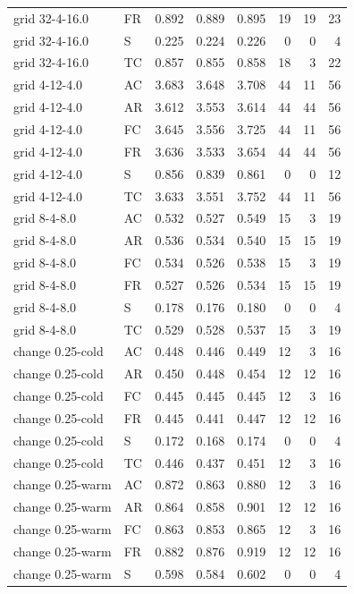 \begin{longtable}{llrrrrrr}
grid 32-4-16.0 & FR & 0.892 & 0.889 & 0.895 & 19 & 19 & 23\\
grid 32-4-16.0 & S & 0.225 & 0.224 & 0.226 & 0 & 0 & 4\\
grid 32-4-16.0 & TC & 0.857 & 0.855 & 0.858 & 18 & 3 & 22\\
grid 4-12-4.0 & AC & 3.683 & 3.648 & 3.708 & 44 & 11 & 56\\
grid 4-12-4.0 & AR & 3.612 & 3.553 & 3.614 & 44 & 44 & 56\\
grid 4-12-4.0 & FC & 3.645 & 3.556 & 3.725 & 44 & 11 & 56\\
grid 4-12-4.0 & FR & 3.636 & 3.533 & 3.654 & 44 & 44 & 56\\
grid 4-12-4.0 & S & 0.856 & 0.839 & 0.861 & 0 & 0 & 12\\
grid 4-12-4.0 & TC & 3.633 & 3.551 & 3.752 & 44 & 11 & 56\\
grid 8-4-8.0 & AC & 0.532 & 0.527 & 0.549 & 15 & 3 & 19\\
grid 8-4-8.0 & AR & 0.536 & 0.534 & 0.540 & 15 & 15 & 19\\
grid 8-4-8.0 & FC & 0.534 & 0.526 & 0.538 & 15 & 3 & 19\\
grid 8-4-8.0 & FR & 0.527 & 0.526 & 0.534 & 15 & 15 & 19\\
grid 8-4-8.0 & S & 0.178 & 0.176 & 0.180 & 0 & 0 & 4\\
grid 8-4-8.0 & TC & 0.529 & 0.528 & 0.537 & 15 & 3 & 19\\
change 0.25-cold & AC & 0.448 & 0.446 & 0.449 & 12 & 3 & 16\\
change 0.25-cold & AR & 0.450 & 0.448 & 0.454 & 12 & 12 & 16\\
change 0.25-cold & FC & 0.445 & 0.445 & 0.445 & 12 & 3 & 16\\
change 0.25-cold & FR & 0.445 & 0.441 & 0.447 & 12 & 12 & 16\\
change 0.25-cold & S & 0.172 & 0.168 & 0.174 & 0 & 0 & 4\\
change 0.25-cold & TC & 0.446 & 0.437 & 0.451 & 12 & 3 & 16\\
change 0.25-warm & AC & 0.872 & 0.863 & 0.880 & 12 & 3 & 16\\
change 0.25-warm & AR & 0.864 & 0.858 & 0.901 & 12 & 12 & 16\\
change 0.25-warm & FC & 0.863 & 0.853 & 0.865 & 12 & 3 & 16\\
change 0.25-warm & FR & 0.882 & 0.876 & 0.919 & 12 & 12 & 16\\
change 0.25-warm & S & 0.598 & 0.584 & 0.602 & 0 & 0 & 4\\

\end{longtable}
